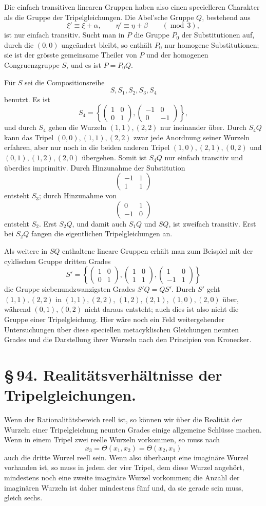 \documentclass[11pt]{article}
\providecommand{\mat}[4]{\begin{pmatrix}#1&#2\\#3&#4\end{pmatrix}}
\providecommand{\mat}[4]{\begin{pmatrix}#1&#2\\#3&#4\end{pmatrix}}
\begin{document}
Die einfach transitiven linearen Gruppen haben also einen specielleren Charakter als die Gruppe der Tripelgleichungen. Die Abel'sche Gruppe \(Q\), bestehend aus
\begin{equation}
 \xi'\equiv \xi+\alpha,
 \qquad
 \eta'\equiv \eta+\beta
 \qquad(\operatorname{mod}\,3),
 \tag{9}
\end{equation}
ist nur einfach transitiv. Sucht man in \(P\) die Gruppe \(P_0\) der Substitutionen auf, durch die \((0,0)\) ungeändert bleibt, so enthält \(P_0\) nur homogene Substitutionen; sie ist der grösste gemeinsame Theiler von \(P\) und der homogenen Congruenzgruppe \(S\), und es ist \(P=P_0Q\).

Für \(S\) sei die Compositionsreihe
\[
 S,
 S_1,
 S_2,
 S_3,
 S_4
\]
benutzt. Es ist
\[
 S_4=\left\{
 \mat{1}{0}{0}{1},
 \mat{-1}{0}{0}{-1}
 \right\},
\]
und durch \(S_4\) gehen die Wurzeln \((1,1),(2,2)\) nur ineinander über. Durch \(S_4Q\) kann das Tripel \((0,0),(1,1),(2,2)\) zwar jede Anordnung seiner Wurzeln erfahren, aber nur noch in die beiden anderen Tripel \((1,0),(2,1),(0,2)\) und \((0,1),(1,2),(2,0)\) übergehen. Somit ist \(S_4Q\) nur einfach transitiv und überdies imprimitiv. Durch Hinzunahme der Substitution
\[
 \mat{-1}{1}{1}{1}
\]
entsteht \(S_3\); durch Hinzunahme von
\[
 \mat{0}{1}{-1}{0}
\]
entsteht \(S_2\). Erst \(S_2Q\), und damit auch \(S_1Q\) und \(SQ\), ist zweifach transitiv. Erst bei \(S_2Q\) fangen die eigentlichen Tripelgleichungen an.

Als weitere in \(SQ\) enthaltene lineare Gruppen erhält man zum Beispiel mit der cyklischen Gruppe dritten Grades
\[
 S'=\left\{
 \mat{1}{0}{0}{1},
 \mat{1}{0}{1}{1},
 \mat{1}{0}{-1}{1}
 \right\}
\]
die Gruppe siebenundzwanzigsten Grades \(S'Q=QS'\). Durch \(S'\) geht \((1,1),(2,2)\) in \((1,1),(2,2)\), \((1,2),(2,1)\), \((1,0),(2,0)\) über, während \((0,1),(0,2)\) nicht daraus entsteht; auch dies ist also nicht die Gruppe einer Tripelgleichung. Hier wäre noch ein Feld weitergehender Untersuchungen über diese speciellen metacyklischen Gleichungen neunten Grades und die Darstellung ihrer Wurzeln nach den Principien von Kronecker.

\section*{\S\,94. Realitätsverhältnisse der Tripelgleichungen.}

Wenn der Rationalitätsbereich reell ist, so können wir über die Realität der Wurzeln einer Tripelgleichung neunten Grades einige allgemeine Schlüsse machen. Wenn in einem Tripel zwei reelle Wurzeln vorkommen, so muss nach
\[
 x_3=\Theta(x_1,x_2)=\Theta(x_2,x_1)
\]
auch die dritte Wurzel reell sein. Wenn also überhaupt eine imaginäre Wurzel vorhanden ist, so muss in jedem der vier Tripel, dem diese Wurzel angehört, mindestens noch eine zweite imaginäre Wurzel vorkommen; die Anzahl der imaginären Wurzeln ist daher mindestens fünf und, da sie gerade sein muss, gleich sechs.
\end{document}
